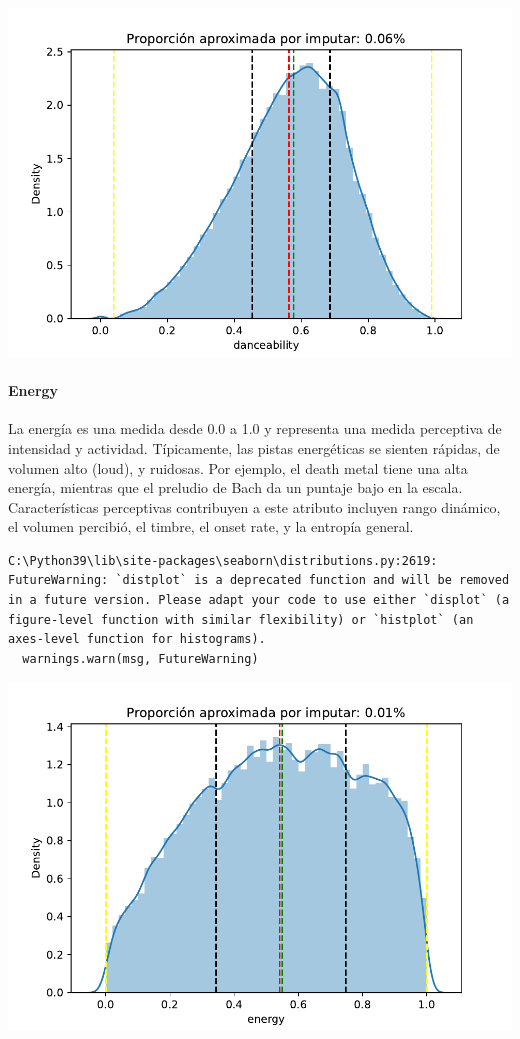 \documentclass[
  letterpaper,
  DIV=11,
  numbers=noendperiod]{scrartcl}
\let\oldparagraph\paragraph
\renewcommand{\paragraph}[1]{\oldparagraph{#1}\mbox{}}
\begin{document}
\includegraphics{informe_01_files/figure-pdf/unnamed-chunk-22-13.pdf}

\hypertarget{energy}{%
\paragraph{Energy}\label{energy}}

La energía es una medida desde 0.0 a 1.0 y representa una medida
perceptiva de intensidad y actividad. Típicamente, las pistas
energéticas se sienten rápidas, de volumen alto (loud), y ruidosas. Por
ejemplo, el death metal tiene una alta energía, mientras que el preludio
de Bach da un puntaje bajo en la escala. Características perceptivas
contribuyen a este atributo incluyen rango dinámico, el volumen
percibió, el timbre, el onset rate, y la entropía general.

\begin{verbatim}
C:\Python39\lib\site-packages\seaborn\distributions.py:2619: FutureWarning: `distplot` is a deprecated function and will be removed in a future version. Please adapt your code to use either `displot` (a figure-level function with similar flexibility) or `histplot` (an axes-level function for histograms).
  warnings.warn(msg, FutureWarning)
\end{verbatim}

\includegraphics{informe_01_files/figure-pdf/unnamed-chunk-24-15.pdf}
\end{document}
